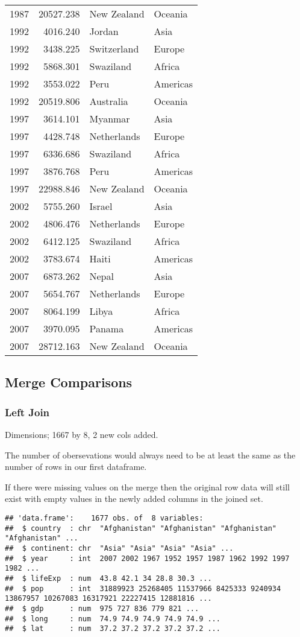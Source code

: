 \documentclass[
]{article}
\begin{document}
\begin{longtable}[]{@{}rrll@{}}
1987 & 20527.238 & New Zealand & Oceania\tabularnewline
1992 & 4016.240 & Jordan & Asia\tabularnewline
1992 & 3438.225 & Switzerland & Europe\tabularnewline
1992 & 5868.301 & Swaziland & Africa\tabularnewline
1992 & 3553.022 & Peru & Americas\tabularnewline
1992 & 20519.806 & Australia & Oceania\tabularnewline
1997 & 3614.101 & Myanmar & Asia\tabularnewline
1997 & 4428.748 & Netherlands & Europe\tabularnewline
1997 & 6336.686 & Swaziland & Africa\tabularnewline
1997 & 3876.768 & Peru & Americas\tabularnewline
1997 & 22988.846 & New Zealand & Oceania\tabularnewline
2002 & 5755.260 & Israel & Asia\tabularnewline
2002 & 4806.476 & Netherlands & Europe\tabularnewline
2002 & 6412.125 & Swaziland & Africa\tabularnewline
2002 & 3783.674 & Haiti & Americas\tabularnewline
2007 & 6873.262 & Nepal & Asia\tabularnewline
2007 & 5654.767 & Netherlands & Europe\tabularnewline
2007 & 8064.199 & Libya & Africa\tabularnewline
2007 & 3970.095 & Panama & Americas\tabularnewline
2007 & 28712.163 & New Zealand & Oceania\tabularnewline
\bottomrule
\end{longtable}

\hypertarget{merge-comparisons}{%
\subsection{Merge Comparisons}\label{merge-comparisons}}

\hypertarget{left-join}{%
\subsubsection{Left Join}\label{left-join}}

Dimensions; 1667 by 8, 2 new cols added.

The number of obersevations would always need to be at least the same as
the number of rows in our first dataframe.

If there were missing values on the merge then the original row data
will still exist with empty values in the newly added columns in the
joined set.

\begin{verbatim}
## 'data.frame':    1677 obs. of  8 variables:
##  $ country  : chr  "Afghanistan" "Afghanistan" "Afghanistan" "Afghanistan" ...
##  $ continent: chr  "Asia" "Asia" "Asia" "Asia" ...
##  $ year     : int  2007 2002 1967 1952 1957 1987 1962 1992 1997 1982 ...
##  $ lifeExp  : num  43.8 42.1 34 28.8 30.3 ...
##  $ pop      : int  31889923 25268405 11537966 8425333 9240934 13867957 10267083 16317921 22227415 12881816 ...
##  $ gdp      : num  975 727 836 779 821 ...
##  $ long     : num  74.9 74.9 74.9 74.9 74.9 ...
##  $ lat      : num  37.2 37.2 37.2 37.2 37.2 ...
\end{verbatim}
\end{document}

